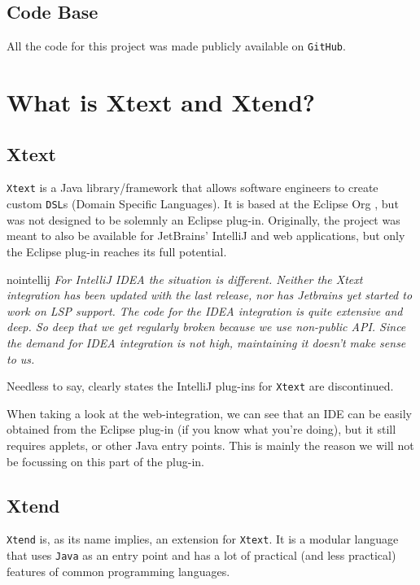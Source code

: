 \documentclass[review]{elsarticle}
\begin{document}
\subsection{Code Base}
All the code for this project was made publicly available on \texttt{GitHub}.




\section{What is Xtext and Xtend?}
\label{sec:xtext}

\subsection{Xtext}
\texttt{Xtext} \cite{xtext} is a \textsf{Java} library/framework that allows software engineers to create custom \texttt{DSL}s (Domain Specific Languages). It is based at the \textsf{Eclipse Org} \cite{eclipse}, but was not designed to be solemnly an \textsf{Eclipse} plug-in. Originally, the project was meant to also be available for \textsf{JetBrains}' \textsf{IntelliJ} and web applications, but only the \textsf{Eclipse} plug-in reaches its full potential.

\begin{displaycquote}{nointellij}
	\textit{For IntelliJ IDEA the situation is different. Neither the Xtext integration has been updated with the last release, nor has Jetbrains yet started to work on LSP support. The code for the IDEA integration is quite extensive and deep. So deep that we get regularly broken because we use non-public API. Since the demand for IDEA integration is not high, maintaining it doesn’t make sense to us.}
\end{displaycquote}

Needless to say, \cite{nointellij} clearly states the \textsf{IntelliJ} plug-ins for \texttt{Xtext} are discontinued.

When taking a look at the web-integration, we can see that an \textsf{IDE} can be easily obtained from the \textsf{Eclipse} plug-in (if you know what you're doing), but it still requires applets, or other \textsf{Java} entry points. This is mainly the reason we will not be focussing on this part of the plug-in.

\subsection{Xtend}
\texttt{Xtend} is, as its name implies, an extension for \texttt{Xtext}. It is a modular language that uses \texttt{Java} as an entry point and has a lot of practical (and less practical) features of common programming languages.
\end{document}
